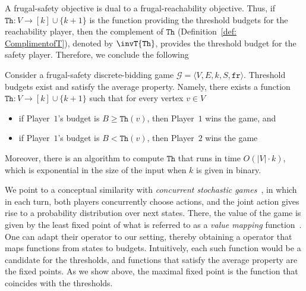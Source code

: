 \documentclass{article}\providecommand{\nequiv}{\not\equiv}\usepackage[a4paper,margin=20mm]{geometry}
\newcommand{\PO}{Player~$1$\xspace}
\newcommand{\PT}{Player~$2$\xspace}
\newcommand{\G}{{\mathcal G}}
\newcommand{\fr}{\texttt{fr}}
\newcommand{\thresh}{\texttt{Th}\xspace}
\newcommand{\zug}[1]{\langle #1  \rangle}
\newcommand{\stam}[1]{}
\begin{document}
A frugal-safety objective is dual to a frugal-reachability objective. 
 Thus, if \(\thresh: V \rightarrow [k] \cup \{k+1\}\) is the function providing the threshold budgets for the reachability player, then the complement of \(\thresh\) (Definition~\ref{def: ComplimentofT}), denoted by \(\invT{\thresh}\), provides the threshold budget for the safety player. 
 Therefore, we conclude the following 
  
\begin{corollary}\label{corr: frugalSafety}
	Consider a frugal-safety discrete-bidding game \(\G = \zug{V, E, k, S, \fr}\). Threshold budgets exist and satisfy the average property. 
	Namely, there exists a function \(\thresh: V \rightarrow [k] \cup \{k+1\}\) such that for every vertex $v \in V$ 
	\begin{itemize}
		\item if \PO's budget is $B \geq \thresh(v)$, then \PO wins the game, and
		\item if \PO's budget is $B < \thresh(v)$, then \PT wins the game
	\end{itemize}
	Moreover, there is an algorithm to compute $\thresh$ that runs in time $O(|V| \cdot k)$, which is exponential in the size of the input when $k$ is given in binary.
\end{corollary}


\begin{remark}
We point to a conceptual similarity with {\em concurrent stochastic games}~\cite{Everett57}, in which in each turn, both players concurrently choose actions, and the joint action gives rise to a probability distribution over next states. There, the value of the game is given by the least fixed point of what is referred to as a \emph{value mapping} function~\cite{Everett57,FV12}. 
One can adapt their operator to our setting, thereby obtaining a operator that maps functions from states to budgets. Intuitively, each such function would be a candidate for the thresholds, and functions that satisfy the average property are the fixed points. As we show above, the maximal fixed point is the function that coincides with the thresholds. 
\stam{%
On the other hand, structurally there is a similarity in between our algorithm for computing the threshold budgets and how values of a concurrent stochastic reachability games are computed~\cite{Everett57, FV12}. 
There, the values are given by the least fixed point of what is referred to as a \emph{value mapping} function~\cite{Everett57}. 
In our case this value mapping function maps one candidate for a function computing threshold budgets to another candidate of the same.
}
\end{remark}
\end{document}
